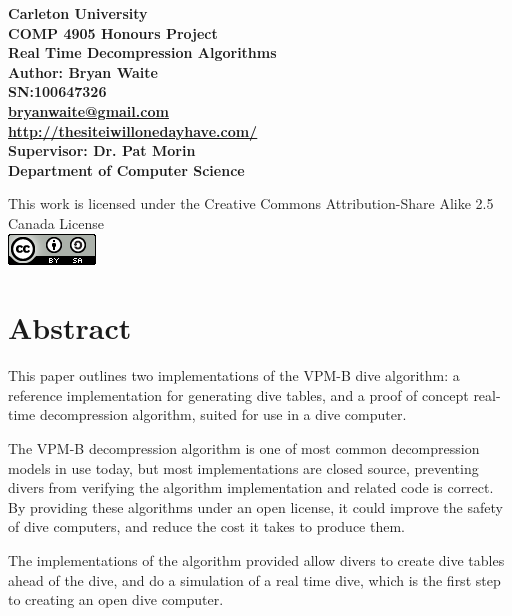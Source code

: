 \documentclass[12pt]{article}
\begin{document}
\begin{titlepage}
\begin{center}
\large{\textbf{Carleton University}\\
\textbf{COMP 4905 Honours Project}\\
\textbf{Real Time Decompression Algorithms}\\
\textbf{Author: Bryan Waite}\\
\textbf{SN:100647326}\\
\textbf{\color{blue}\uline{\href{mailto:bryanwaite@gmail.com}{bryanwaite@gmail.com}}}\\
\textbf{\color{blue}\uline{\href{http://thesiteiwillonedayhave.com/}{http://thesiteiwillonedayhave.com/}}}\\
\textbf{Supervisor: Dr. Pat Morin}\\
\textbf{Department of Computer Science}}\\
\date{\today}

\vfill
This work is licensed under the Creative Commons Attribution-Share Alike 2.5 Canada License \\
\includegraphics{cc_by_sa.png}
\end{center}
\end{titlepage}

\newpage

\section*{Abstract}
\small{This paper outlines two implementations of the VPM-B dive algorithm: a reference implementation for
  generating dive tables, and a proof of concept real-time decompression algorithm, suited for
  use in a dive computer.

  The VPM-B decompression algorithm is one of most common decompression models in use today, but most
  implementations are closed source, preventing divers from verifying the algorithm implementation and related code
  is correct. By providing these algorithms under an open license, it could improve the safety of dive
  computers, and reduce the cost it takes to produce them.

  The implementations of the algorithm provided allow divers to create dive tables ahead of the dive, and
  do a simulation of a real time dive, which is the first step to creating an open dive computer.
}
\end{document}
